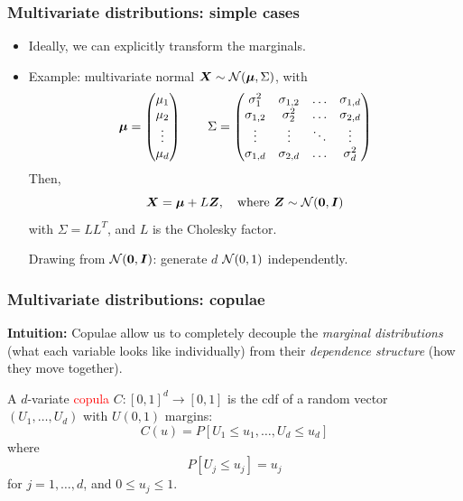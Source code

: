 \documentclass[aspectratio=169]{beamer}
\begin{document}
\begin{frame}
\frametitle{Multivariate distributions: simple cases}

\begin{itemize}
\item 
Ideally, we can explicitly transform the marginals.
\item
Example: multivariate normal ${\boldsymbol{X}} \sim {\mathcal{N}}({\boldsymbol{\mu}}, \Sigma)$, with
$$
{\boldsymbol{\mu}} =
\begin{pmatrix}
	\mu_1 \\ \mu_2 \\ \vdots \\ \mu_d
\end{pmatrix}
\qquad
\Sigma = 
\begin{pmatrix}
	\sigma^2_1 & \sigma_{1,2} & \ldots & \sigma_{1,d} \\
	\sigma_{1,2} & \sigma^2_2 & \ldots & \sigma_{2,d} \\
	\vdots & \vdots & \ddots & \vdots \\
	\sigma_{1,d} & \sigma_{2,d} & \ldots & \sigma^2_d 
\end{pmatrix}
$$
Then,
$$
{\boldsymbol{X}} = {\boldsymbol{\mu}} + L{\boldsymbol{Z}}, \quad \text{where } {\boldsymbol{Z}} \sim {\mathcal{N}}({\boldsymbol{0}}, {\boldsymbol{I}})
$$
with $\Sigma = LL^T$, and $L$ is the Cholesky factor.

Drawing from ${\mathcal{N}}({\boldsymbol{0}},{\boldsymbol{I}})$: generate $d$ ${\mathcal{N}}(0,1)$ independently.
\end{itemize}
		
\end{frame}

\begin{frame}
\frametitle{Multivariate distributions: copulae}

\textbf{Intuition:} Copulae allow us to completely decouple the \textit{marginal distributions} (what each variable looks like individually) from their \textit{dependence structure} (how they move together).

\mbox{}

A $d$-variate \textcolor{red}{copula} $C: [0, 1]^d \rightarrow [0, 1]$ is the cdf of a random vector
$(U_1,\ldots, U_d)$ with $U(0, 1)$ margins:
$$
C(u) = P[U_1 \leq u_1,\ldots, U_d \leq u_d]
$$
where
$$
P[U_j \leq u_j] = u_j
$$
for $j = 1,\ldots,d$, and $0 \leq u_j \leq 1$.

\end{frame}
\end{document}
